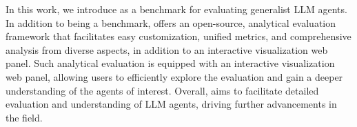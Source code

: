 In this work, we introduce \BenchName{} as a benchmark for evaluating generalist LLM agents. In addition to being a benchmark, \BenchName{} offers an open-source, analytical evaluation framework that facilitates easy customization, unified metrics, and comprehensive analysis from diverse aspects, in addition to an interactive visualization web panel. 
Such analytical evaluation is equipped with an interactive visualization web panel, allowing users to efficiently explore the evaluation and gain a deeper understanding of the agents of interest. 
Overall, \BenchName{} aims to facilitate detailed evaluation and understanding of LLM agents, driving further advancements in the field.

